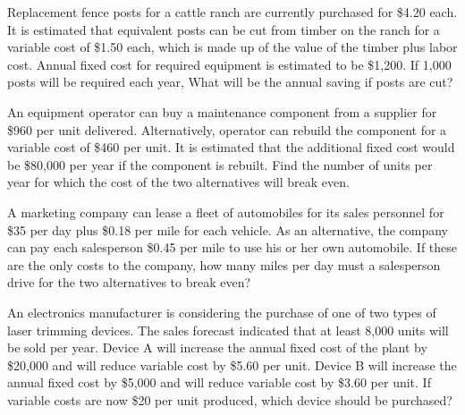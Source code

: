 \begin{exercises}
    \begin{exercise}
    \label{sea-08-18}
        Replacement fence posts for a cattle ranch are currently purchased for \$4.20 each. It is estimated that equivalent posts can be cut from timber on the ranch for a variable cost of \$1.50 each, which is made up of the value of the timber plus labor cost. Annual fixed cost for required equipment is estimated to be \$1,200. If 1,000 posts will be required each year, What will be the annual saving if posts are cut?
    \end{exercise}
    \begin{solution}
    \end{solution}
    
    \begin{exercise}
    \label{sea-08-19}
        An equipment operator can buy a maintenance component from a supplier for \$960 per unit delivered. Alternatively, operator can rebuild the component for a variable cost of \$460 per unit. It is estimated that the additional fixed cost would be \$80,000 per year if the component is rebuilt. Find the number of units per year for which the cost of the two alternatives will break even.
    \end{exercise}
    \begin{solution}
    \end{solution}
    
    \begin{exercise}
    \label{sea-08-20}
        A marketing company can lease a fleet of automobiles for its sales personnel for \$35 per day plus \$0.18 per mile for each vehicle. As an alternative, the company can pay each salesperson \$0.45 per mile to use his or her own automobile. If these are the only costs to the company, how many miles per day must a salesperson drive for the two alternatives to break even?
    \end{exercise}
    \begin{solution}
    \end{solution}
    
    \begin{exercise}
    \label{sea-08-21}
        An electronics manufacturer is considering the purchase of one of two types of laser trimming devices. The sales forecast indicated that at least 8,000 units will be sold per year. Device A will increase the annual fixed cost of the plant by \$20,000 and will reduce variable cost by \$5.60 per unit. Device B will increase the annual fixed cost by \$5,000 and will reduce variable cost by \$3.60 per unit. If variable costs are now \$20 per unit produced, which device should be purchased?
    \end{exercise}
    \begin{solution}
    \end{solution}
    

\end{exercises}
